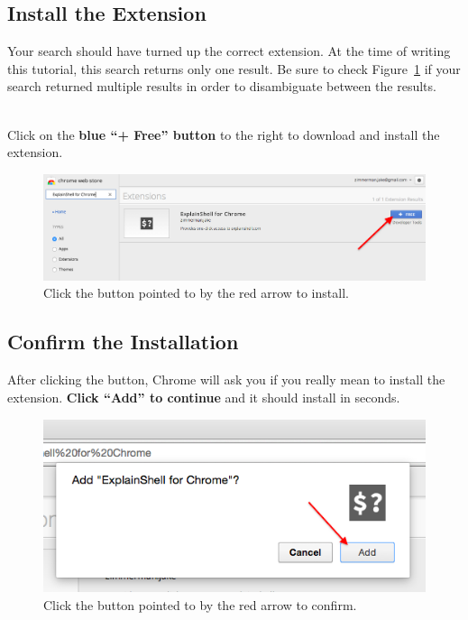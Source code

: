 \documentclass[11pt]{article}
\begin{document}
\subsection{Install the Extension}
Your search should have turned up the correct extension. At the time of writing this tutorial, this search returns only one result. Be sure to check Figure~\ref{install} if your search returned multiple results in order to disambiguate between the results.

\mbox{}\\
\noindent
Click on the \textbf{blue ``+ Free'' button} to the right to download and install the extension.

\begin{figure}[H]
  \begin{center}
    \includegraphics[width=\textwidth, height=\textheight, keepaspectratio]{03install}
  \end{center}
  \caption{Click the button pointed to by the red arrow to install.}
  \label{install}
\end{figure}

\subsection{Confirm the Installation}
After clicking the button, Chrome will ask you if you really mean to install the extension. \textbf{Click ``Add'' to continue} and it should install in seconds.

\begin{figure}[H]
  \begin{center}
    \includegraphics[height=2in, keepaspectratio]{04confirm}
  \end{center}
  \caption{Click the button pointed to by the red arrow to confirm.}
  \label{confirm}
\end{figure}
\end{document}
